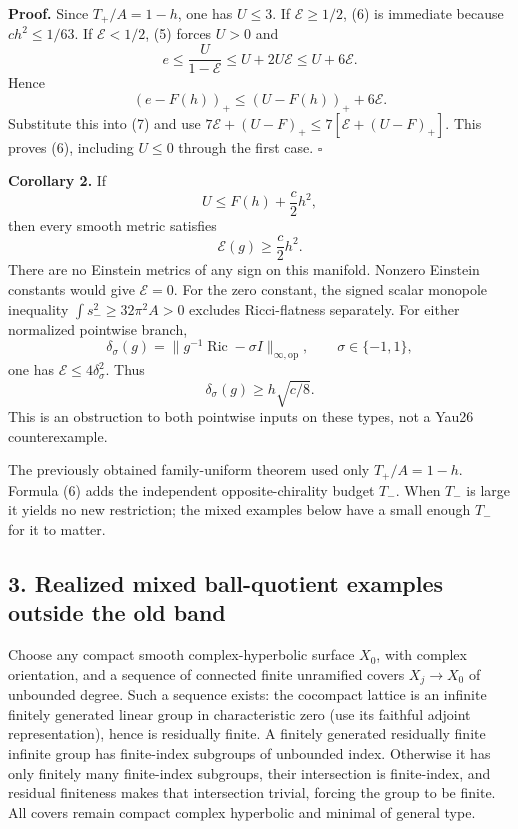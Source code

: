 \documentclass[
  10pt,
]{article}
\begin{document}
\textbf{Proof.} Since \(T_+/A=1-h\), one has \(U\le3\). If
\(\mathcal E\ge1/2\), (6) is immediate because \(c h^2\le1/63\). If
\(\mathcal E<1/2\), (5) forces \(U>0\) and \[
 e\le\frac{U}{1-\mathcal E}
 \le U+2U\mathcal E\le U+6\mathcal E.
\] Hence \[
 (e-F(h))_+\le(U-F(h))_++6\mathcal E.
\] Substitute this into (7) and use
\(7\mathcal E+(U-F)_+\le7[\mathcal E+(U-F)_+]\). This proves (6),
including \(U\le0\) through the first case. \(\square\)

\textbf{Corollary 2.} If \[
 U\le F(h)+\frac c2 h^2,
 \tag{8}
\] then every smooth metric satisfies \[
 \mathcal E(g)\ge\frac c2 h^2.
 \tag{9}
\] There are no Einstein metrics of any sign on this manifold. Nonzero
Einstein constants would give \(\mathcal E=0\). For the zero constant,
the signed scalar monopole inequality \(\int s_-^2\ge32\pi^2A>0\)
excludes Ricci-flatness separately. For either normalized pointwise
branch, \[
 \delta_\sigma(g)=\|g^{-1}\operatorname{Ric}-\sigma I\|_{\infty,\mathrm{op}},
 \qquad\sigma\in\{-1,1\},
\] one has \(\mathcal E\le4\delta_\sigma^2\). Thus \[
 \boxed{\delta_\sigma(g)\ge h\sqrt{c/8}.}
 \tag{10}
\] This is an obstruction to both pointwise inputs on these types, not a
Yau26 counterexample.

The previously obtained family-uniform theorem used only \(T_+/A=1-h\).
Formula (6) adds the independent opposite-chirality budget \(T_-\). When
\(T_-\) is large it yields no new restriction; the mixed examples below
have a small enough \(T_-\) for it to matter.

\hypertarget{realized-mixed-ball-quotient-examples-outside-the-old-band}{%
\subsection{3. Realized mixed ball-quotient examples outside the old
band}\label{realized-mixed-ball-quotient-examples-outside-the-old-band}}

Choose any compact smooth complex-hyperbolic surface \(X_0\), with
complex orientation, and a sequence of connected finite unramified
covers \(X_j\to X_0\) of unbounded degree. Such a sequence exists: the
cocompact lattice is an infinite finitely generated linear group in
characteristic zero (use its faithful adjoint representation), hence is
residually finite. A finitely generated residually finite infinite group
has finite-index subgroups of unbounded index. Otherwise it has only
finitely many finite-index subgroups, their intersection is
finite-index, and residual finiteness makes that intersection trivial,
forcing the group to be finite. All covers remain compact complex
hyperbolic and minimal of general type.
\end{document}
